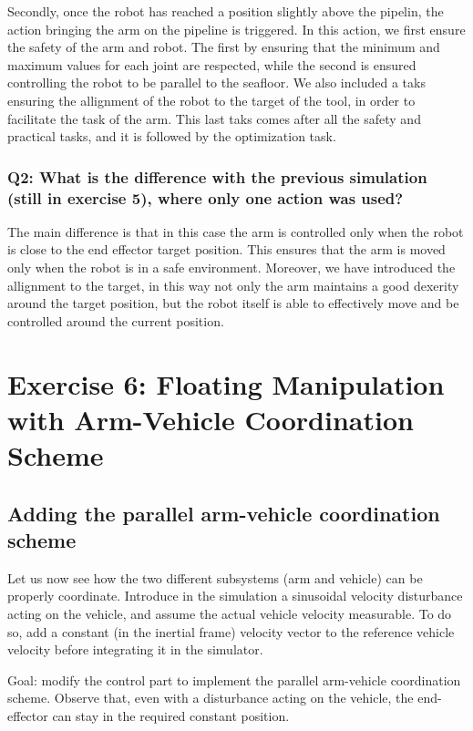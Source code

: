 \documentclass{article}
\begin{document}
Secondly, once the robot has reached a position slightly above the pipelin, the action bringing the arm on the pipeline is triggered. In this action, we first ensure the safety of the arm and robot. The first by ensuring that the minimum and maximum values for each joint are respected, while the second is ensured controlling the robot to be parallel to the seafloor. We also included a taks ensuring the allignment of the robot to the target of the tool, in order to facilitate the task of the arm. This last taks comes after all the safety and practical tasks, and it is followed by the optimization task. 

\subsubsection{Q2: What is the difference with the previous simulation (still in exercise 5), where only one action was used?}

The main difference is that in this case the arm is controlled only when the robot is close to the end effector target position. This ensures that the arm is moved only when the robot is in a safe environment. 
Moreover, we have introduced the allignment to the target, in this way not only the arm maintains a good dexerity around the target position, but the robot itself is able to effectively move and be controlled around the current position. 
\clearpage
\section{Exercise 6: Floating Manipulation with Arm-Vehicle Coordination Scheme}
\subsection{Adding the parallel arm-vehicle coordination scheme}
Let us now see how the two different subsystems (arm and vehicle) can be properly coordinate. Introduce in the simulation a sinusoidal velocity disturbance acting on the vehicle, and assume the actual vehicle velocity measurable. To do so, add a constant (in the inertial frame) velocity vector to the reference vehicle velocity before integrating it in the simulator.

Goal: modify the control part to implement the parallel arm-vehicle coordination scheme. Observe that, even with a disturbance acting on the vehicle, the end-effector can stay in the required constant position.
\end{document}
